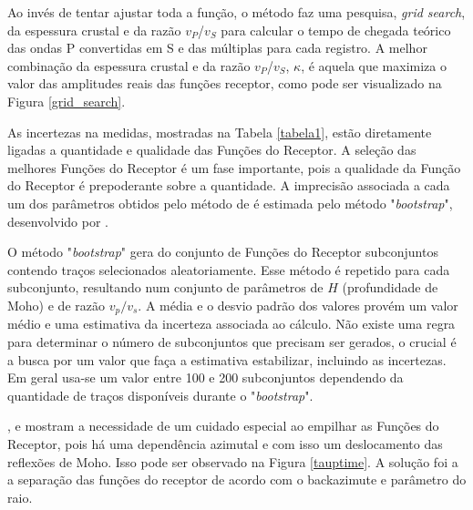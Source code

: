Ao invés de tentar ajustar toda a função, o método faz uma pesquisa, \textit{grid search}, da espessura crustal e da razão $v_{P}$/$v_{S}$ para calcular o tempo de chegada teórico das ondas P convertidas em S e das múltiplas para cada registro. A melhor combinação da espessura crustal e da razão $v_{P}$/$v_{S}$, $\kappa$, é aquela que maximiza o valor das amplitudes reais das funções receptor, como pode ser visualizado na Figura \ref{grid_search}.

As incertezas na medidas, mostradas na Tabela \ref{tabela1}, estão diretamente ligadas a quantidade e qualidade das Funções do Receptor. A seleção das melhores Funções do Receptor é um fase importante, pois a qualidade da Função do Receptor é prepoderante sobre a quantidade. A imprecisão associada a cada um dos parâmetros obtidos pelo método de \cite{Zhu_Kanamori_2000} é estimada pelo método "\textit{bootstrap}", desenvolvido por \cite{efron_statistical_1991}.

O método "\textit{bootstrap}" gera do conjunto de Funções do Receptor subconjuntos contendo traços selecionados aleatoriamente. Esse método é repetido para cada subconjunto, resultando num conjunto de parâmetros de $H$ (profundidade de Moho) e de razão $v_{p}/v_{s}$. A média e o desvio padrão dos valores provém um valor médio e uma estimativa da incerteza associada ao cálculo. Não existe uma regra para determinar o número de subconjuntos que precisam ser gerados, o crucial é a busca por um valor que faça a estimativa estabilizar, incluindo as incertezas. Em geral usa-se um valor entre 100 e 200 subconjuntos dependendo da quantidade de traços disponíveis durante o "\textit{bootstrap}".

\cite{assumpcao_crustal_2002},\cite{sand_franca_crustal_2004} e \cite{julia_deep_2008} mostram a necessidade de um cuidado especial ao empilhar as Funções do Receptor, pois há uma dependência azimutal  e com isso um deslocamento das reflexões de Moho. Isso pode ser observado na Figura \ref{tauptime}. A solução foi a a separação das funções do receptor de acordo com o backazimute e parâmetro do raio. 


